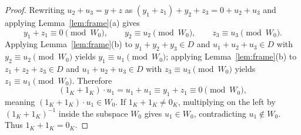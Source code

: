 \documentclass[11pt]{article}
\theoremstyle{definition}
\begin{document}
\begin{proof}
Rewriting $u_2 + u_3 = y + z$ as $(y_1 + z_1) + y_2 + z_3 = 0 + u_2 + u_3$ and applying
Lemma~\ref{lem:frame}(a) gives
\[
  y_1 + z_1 \equiv 0 \pmod{W_0}, \qquad
  y_2 \equiv u_2 \pmod{W_0}, \qquad
  z_3 \equiv u_3 \pmod{W_0}.
\]
Applying Lemma~\ref{lem:frame}(b) to $y_1 + y_2 + y_3 \in D$ and $u_1 + u_2 + u_3 \in D$
with $y_2 \equiv u_2 \pmod{W_0}$ yields $y_1 \equiv u_1 \pmod{W_0}$; applying
Lemma~\ref{lem:frame}(b) to $z_1 + z_2 + z_3 \in D$ and $u_1 + u_2 + u_3 \in D$ with
$z_3 \equiv u_3 \pmod{W_0}$ yields $z_1 \equiv u_1 \pmod{W_0}$. Therefore
\[
  (1_K + 1_K) \cdot u_1 = u_1 + u_1 \equiv y_1 + z_1 \equiv 0 \pmod{W_0},
\]
meaning $(1_K + 1_K) \cdot u_1 \in W_0$. If $1_K + 1_K \ne 0_K$, multiplying on the left
by $(1_K + 1_K)^{-1}$ inside the subspace $W_0$ gives $u_1 \in W_0$, contradicting
$u_1 \notin W_0$. Thus $1_K + 1_K = 0_K$.
\end{proof}
\end{document}
